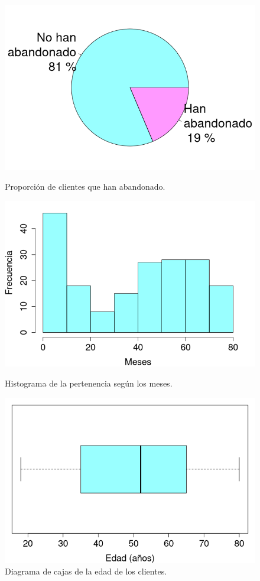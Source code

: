 \documentclass[10pt,a4paper]{article}
\begin{document}
\begin{figure}[!htb]
  \includegraphics[width=\linewidth]{per-freq-pie}
  \caption{Proporción de clientes que han abandonado.}\label{fig:per-freq-pie}
\endminipage\hfill
{}
  \includegraphics[width=\linewidth]{per-freq-hist}
  \caption{Histograma de la pertenencia según los meses.}\label{fig:per-freq-hist}
\endminipage\hfill
{}
  \includegraphics[width=\linewidth]{age-box}
  \caption{Diagrama de cajas de la edad de los clientes.}\label{fig:age-box}
\endminipage\hfill
\end{figure}
\end{document}

